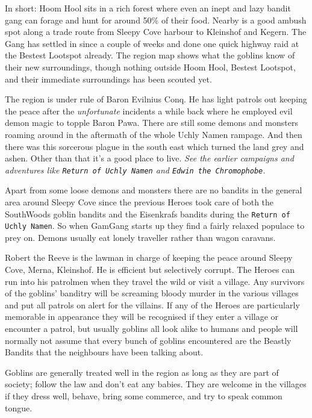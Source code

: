 In short: Hoom Hool sits in a rich forest where even an inept and lazy bandit gang can forage and hunt for around 50\% of their food. Nearby is a good ambush spot along a trade route from Sleepy Cove harbour to Kleinshof and Kegern. The Gang has settled in since a couple of weeks and done one quick highway raid at the Bestest Lootspot already. The region map shows what the goblins know of their new surroundings, though nothing outside Hoom Hool, Bestest Lootspot, and their immediate surroundings has been scouted yet.

The region is under rule of Baron Evilnius Conq. He has light patrols out keeping the peace after the \emph{unfortunate} incidents a while back where he employed evil demon magic to topple Baron Pawa. There are still some demons and monsters roaming around in the aftermath of the whole Uchly Namen rampage. And then there was this sorcerous plague in the south east which turned the land grey and ashen. Other than that it's a good place to live. \textit{See the earlier campaigns and adventures like \texttt{Return of Uchly Namen} and \texttt{Edwin the Chromophobe}.}

Apart from some loose demons and monsters there are no bandits in the general area around Sleepy Cove since the previous Heroes took care of both the SouthWoods goblin bandits and the Eisenkrafs bandits during the \texttt{Return of Uchly Namen}. So when GamGang starts up they find a fairly relaxed populace to prey on. Demons usually eat lonely traveller rather than wagon caravans.

Robert the Reeve is the lawman in charge of keeping the peace around Sleepy Cove, Merna, Kleinshof. He is efficient but selectively corrupt. The Heroes can run into his patrolmen when they travel the wild or visit a village. Any survivors of the goblins' banditry will be screaming bloody murder in the various villages and put all patrols on alert for the villains. If any of the Heroes are particularly memorable in appearance they will be recognised if they enter a village or encounter a patrol, but usually goblins all look alike to humans and people will normally not assume that every bunch of goblins encountered are the Beastly Bandits that the neighbours have been talking about.

Goblins are generally treated well in the region as long as they are part of society; follow the law and don't eat any babies. They are welcome in the villages if they dress well, behave, bring some commerce, and try to speak common tongue.

